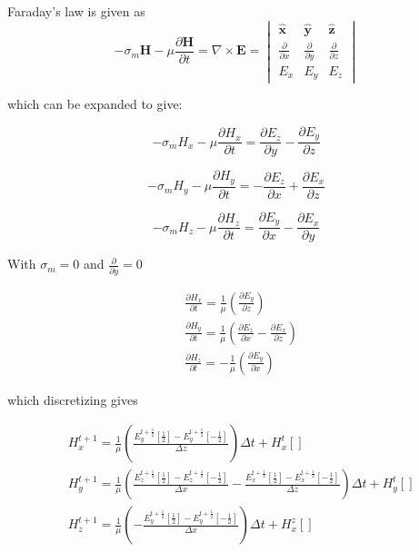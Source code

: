 Faraday's law is given as \cite{FDTD_Schneider}
\begin{equation}
-\sigma_{m}  \boldsymbol{H} - \mu \frac{\partial  \boldsymbol{H}}{\partial t} = \nabla \times \boldsymbol{E} =
\begin{vmatrix} \hat{\boldsymbol{x}} & \hat{\boldsymbol{y}} & \hat{\boldsymbol{z}} \\ 
\frac{\partial}{\partial x} & \frac{\partial}{\partial y} & \frac{\partial}{\partial z} \\ 
E_{x} & E_{y} & E_{z}
\end{vmatrix}
\end{equation}

which can be expanded to give:

\begin{equation}
-\sigma_{m}  H_{x} - \mu \frac{\partial  H_{x}}{\partial t} = \frac{\partial  E_{z}}{\partial y}-\frac{\partial  E_{y}}{\partial z}
\end{equation}

\begin{equation}
-\sigma_{m}  H_{y} - \mu \frac{\partial  H_{y}}{\partial t} = -\frac{\partial  E_{z}}{\partial x}+\frac{\partial  E_{x}}{\partial z}
\end{equation}

\begin{equation}
-\sigma_{m}  H_{z} - \mu \frac{\partial  H_{z}}{\partial t} = \frac{\partial  E_{y}}{\partial x}-\frac{\partial  E_{x}}{\partial y}
\end{equation}

With $\sigma_m=0$ and $\frac{\partial}{\partial y}=0$

\begin{equation}
\begin{split}
  &\frac{\partial  H_{x}}{\partial t} = \frac{1}{\mu} \left ( \frac{\partial  E_{y}}{\partial z} \right )\\
  &\frac{\partial  H_{y}}{\partial t} = \frac{1}{\mu} \left ( \frac{\partial  E_{z}}{\partial x}-\frac{\partial  E_{x}}{\partial z} \right )\\
  &\frac{\partial  H_{z}}{\partial t} = - \frac{1}{\mu} \left ( \frac{\partial  E_{y}}{\partial x} \right )
\end{split}
\end{equation}


which discretizing gives

\begin{equation}
\begin{split}
  & H_{x}^{t+1} = \frac{1}{\mu} \left ( \frac{E_{y}^{t+\frac{1}{2}}[\frac{1}{2}]-E_{y}^{t+\frac{1}{2}}[-\frac{1}{2}]}{\Delta z} \right ) \Delta t + H_{x}^{t}[]\\
  & H_{y}^{t+1} = \frac{1}{\mu} \left ( \frac{E_{z}^{t+\frac{1}{2}}[\frac{1}{2}]-E_{z}^{t+\frac{1}{2}}[-\frac{1}{2}]}{\Delta x}-\frac{E_{x}^{t+\frac{1}{2}}[\frac{1}{2}]-E_{x}^{t+\frac{1}{2}}[-\frac{1}{2}]}{\Delta z} \right ) \Delta t+ H_{y}^{t}[]\\
  & H_{z}^{t+1} =  \frac{1}{\mu} \left ( - \frac{E_{y}^{t+\frac{1}{2}}[\frac{1}{2}]-E_{y}^{t+\frac{1}{2}}[-\frac{1}{2}]}{\Delta x} \right ) \Delta t + H_{x}^{z}[]
\end{split}
\end{equation}
